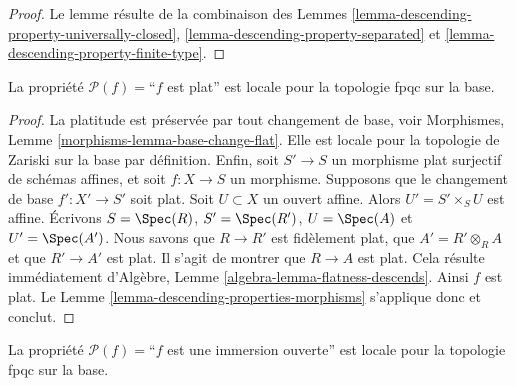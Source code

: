 \begin{proof}
Le lemme résulte de la combinaison des
Lemmes \ref{lemma-descending-property-universally-closed},
\ref{lemma-descending-property-separated}
et \ref{lemma-descending-property-finite-type}.
\end{proof}

\begin{lemma}
\label{lemma-descending-property-flat}
La propriété $\mathcal{P}(f) =$``$f$ est plat''
est locale pour la topologie fpqc sur la base.
\end{lemma}

\begin{proof}
La platitude est préservée par tout changement de base, voir
Morphismes, Lemme \ref{morphisms-lemma-base-change-flat}.
Elle est locale pour la topologie de Zariski sur la base par définition.
Enfin, soit
$S' \to S$ un morphisme plat surjectif de schémas affines,
et soit $f : X \to S$ un morphisme. Supposons que le changement de base
$f' : X' \to S'$ soit plat.
Soit $U \subset X$ un ouvert affine. Alors $U' = S' \times_S U$
est affine. Écrivons
$S = \Spec(R)$,
$S' = \Spec(R')$,
$U = \Spec(A)$ et
$U' = \Spec(A')$.
Nous savons que $R \to R'$ est fidèlement plat,
que $A' = R' \otimes_R A$ et que $R' \to A'$ est plat.
Il s'agit de montrer que $R \to A$ est plat.
Cela résulte immédiatement d'Algèbre,
Lemme \ref{algebra-lemma-flatness-descends}.
Ainsi $f$ est plat.
Le Lemme \ref{lemma-descending-properties-morphisms} s'applique donc et conclut.
\end{proof}

\begin{lemma}
\label{lemma-descending-property-open-immersion}
La propriété $\mathcal{P}(f) =$``$f$ est une immersion ouverte''
est locale pour la topologie fpqc sur la base.
\end{lemma}

